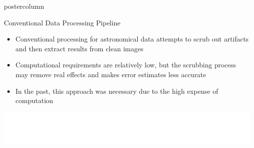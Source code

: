 \documentclass[final,hyperref={pdfpagelabels=false}]{beamer}
\begin{document}
\begin{frame}
\begin{columns}
\begin{column}{.49\textwidth}
\begin{beamercolorbox}[center,wd=\textwidth]{postercolumn}
\begin{minipage}[T]{.95\textwidth}
{            \vspace{2cm}
            \begin{block}{Conventional Data Processing Pipeline}
            \begin{itemize}
              	\item Conventional processing for astronomical data attempts to scrub out artifacts and then extract results from clean images
		\item Computational requirements are relatively low, but the scrubbing process may remove real effects and makes error estimates less accurate
		\item In the past, this approach was necessary due to the high expense of computation
	    \end{itemize}
	      \begin{center}
              \includegraphics[width=0.75\linewidth]{figures/Conventional_Pipeline.pdf}
              \end{center}
            \end{block}

}
\end{minipage}
\end{beamercolorbox}
\end{column}
\end{columns}
\end{frame}
\end{document}

